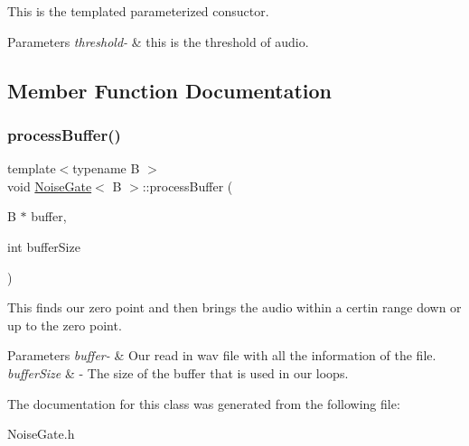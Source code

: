 This is the templated parameterized consuctor. 
\begin{DoxyParams}{Parameters}
{\em threshold-\/} & this is the threshold of audio. \\
\hline
\end{DoxyParams}


\subsection{Member Function Documentation}
\mbox{\label{classNoiseGate_a19ac27671c5d22bfcde73c232f4864ed}} 
\subsubsection{\texorpdfstring{process\+Buffer()}{processBuffer()}}
{\footnotesize\ttfamily template$<$typename B $>$ \\
void \hyperlink{classNoiseGate}{Noise\+Gate}$<$ B $>$\+::process\+Buffer (\begin{DoxyParamCaption}\item[{B $\ast$}]{buffer,  }\item[{int}]{buffer\+Size }\end{DoxyParamCaption})}

This finds our zero point and then brings the audio within a certin range down or up to the zero point. 
\begin{DoxyParams}{Parameters}
{\em buffer-\/} & Our read in wav file with all the information of the file. \\
\hline
{\em buffer\+Size} & -\/ The size of the buffer that is used in our loops. \\
\hline
\end{DoxyParams}


The documentation for this class was generated from the following file\+:\begin{DoxyCompactItemize}
\item 
Noise\+Gate.\+h\end{DoxyCompactItemize}
